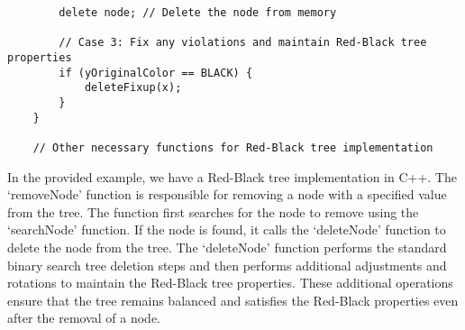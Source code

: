 \begin{solution}
\begin{verbatim}
        delete node; // Delete the node from memory
    
        // Case 3: Fix any violations and maintain Red-Black tree properties
        if (yOriginalColor == BLACK) {
            deleteFixup(x);
        }
    }
    
    // Other necessary functions for Red-Black tree implementation
    \end{verbatim}

    \horizontalline
    
    In the provided example, we have a Red-Black tree implementation in C++. The `removeNode' function is responsible for removing a node with a specified value from the tree. The function first searches for the node to remove using the `searchNode' function. If the node is found, it calls the `deleteNode' function to delete 
    the node from the tree. The `deleteNode' function performs the standard binary search tree deletion steps and then performs additional adjustments and rotations to maintain the Red-Black tree properties. These additional operations ensure that the tree remains balanced and satisfies the Red-Black properties even after the removal of a node.
\end{solution}

